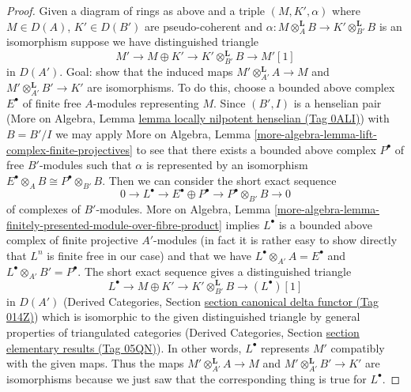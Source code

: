 \documentclass{amsart}
\theoremstyle{plain}
\theoremstyle{definition}
\theoremstyle{remark}
\numberwithin{equation}{subsection}
\begin{document}
\begin{proof}
\medskip\noindent
Given a diagram of rings as above and a triple
$(M, K', \alpha)$ where $M \in D(A)$, $K' \in D(B')$ are
pseudo-coherent and
$\alpha : M \otimes_A^\mathbf{L} B \to K' \otimes_{B'}^\mathbf{L} B$
is an isomorphism suppose we have distinguished triangle
$$
M' \to M \oplus K' \to K' \otimes_{B'}^\mathbf{L} B \to M'[1]
$$
in $D(A')$. Goal: show that the induced maps
$M' \otimes_{A'}^\mathbf{L} A \to M$ and
$M' \otimes_{A'}^\mathbf{L} B' \to K'$ are isomorphisms.
To do this, choose a bounded above complex
$E^\bullet$ of finite free $A$-modules representing $M$.
Since $(B', I)$ is a henselian pair
(More on Algebra, Lemma \href{https://stacks.math.columbia.edu/tag/0ALI}{lemma locally nilpotent henselian (Tag 0ALI)})
with $B = B'/I$ we may apply More on Algebra, Lemma
\ref{more-algebra-lemma-lift-complex-finite-projectives}
to see that there exists a bounded above complex $P^\bullet$
of free $B'$-modules such that $\alpha$ is represented
by an isomorphism $E^\bullet \otimes_A B \cong P^\bullet \otimes_{B'} B$.
Then we can consider the short exact sequence
$$
0 \to L^\bullet \to
E^\bullet \oplus P^\bullet \to P^\bullet \otimes_{B'} B \to 0
$$
of complexes of $B'$-modules.
More on Algebra, Lemma
\ref{more-algebra-lemma-finitely-presented-module-over-fibre-product}
implies $L^\bullet$ is a bounded above complex of
finite projective $A'$-modules
(in fact it is rather easy to show directly that $L^n$ is finite free
in our case) and that we have
$L^\bullet \otimes_{A'} A = E^\bullet$ and
$L^\bullet \otimes_{A'} B' = P^\bullet$.
The short exact sequence gives a distinguished triangle
$$
L^\bullet \to M \oplus K' \to K' \otimes_{B'}^\mathbf{L} B \to (L^\bullet)[1]
$$
in $D(A')$ (Derived Categories, Section
\href{https://stacks.math.columbia.edu/tag/014Z}{section canonical delta functor (Tag 014Z)}) which is isomorphic
to the given distinguished triangle by general properties of
triangulated categories (Derived Categories, Section
\href{https://stacks.math.columbia.edu/tag/05QN}{section elementary results (Tag 05QN)}). In other words, $L^\bullet$
represents $M'$ compatibly with the given maps. Thus the maps
$M' \otimes_{A'}^\mathbf{L} A \to M$ and
$M' \otimes_{A'}^\mathbf{L} B' \to K'$ are
isomorphisms because we just saw that the corresponding
thing is true for $L^\bullet$.
\end{proof}
\end{document}

